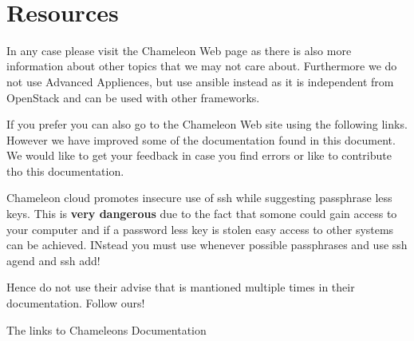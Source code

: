 \FILENAME\

\section{Resources}

In any case please visit the Chameleon Web page as there is also more
information about other topics that we may not care about. Furthermore
we do not use Advanced Appliences, but use ansible instead as it is
independent from OpenStack and can be used with other frameworks.

If you prefer you can also go to the Chameleon Web site using the
following links. However we have improved some of the documentation
found in this document. We would like to get your feedback in case you
find errors or like to contribute tho this documentation.

\begin{WARNING}
  Chameleon cloud promotes insecure use of ssh while suggesting
  passphrase less keys. This is {\bf very dangerous} due to the fact
  that somone could gain access to your computer and if a password
  less key is stolen easy access to other systems can be
  achieved. INstead you must use whenever possible passphrases and use
  ssh agend and ssh add!

  Hence do not use their advise that is mantioned multiple times in
  their documentation. Follow ours!
\end{WARNING}

The links to Chameleons Documentation 

